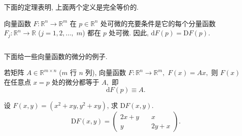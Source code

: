 下面的定理表明, 上面两个定义是完全等价的. 

\begin{theorem}{}
向量函数 $F:\mathbb{R}^{n}\rightarrow\mathbb{R}^{m}$ 在 $p\in\mathbb{R}^{n}$
处可微的充要条件是它的每个分量函数 $F_{j}:\mathbb{R}^{n}\rightarrow\mathbb{R}$ ($j=1,2,\ldots,$ $m$)
都在 $p$ 处可微. 因此, $\mathrm{d}F(p)=\mathrm{D}F(p).$
\end{theorem}
$$$$

下面给一些向量函数的微分的例子.
\begin{example}{}
若矩阵 $A\in\mathbb{R}^{m\times n}$ ($m$ 行 $n$ 列), 向量函数 $F:\mathbb{R}^{n}\rightarrow\mathbb{R}^{m},$
$F(x)=Ax,$ 则 $F(x)$ 在任意点 $x=p$ 处的微分都等于 $A,$ 即
\[
\mathrm{d}F(p)\equiv A.
\]
\end{example}

\begin{example}{}
设 $F(x,y)=(x^{2}+xy,y^{2}+xy)$, 求 $\mathrm{D}F(x,y).$
$$
\mathrm{D}F(x,y)=\left(\begin{array}{cc}
2x+y\quad & x\\
y & 2y+x
\end{array}\right).
$$
\end{example}